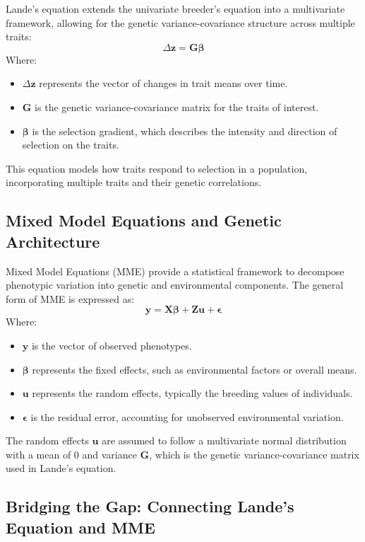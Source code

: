 \documentclass[12pt,a4paper]{article}
\begin{document}
Lande's equation extends the univariate breeder's equation into a multivariate framework, allowing for the genetic variance-covariance structure across multiple traits:
\[
\Delta \mathbf{z} = \mathbf{G} \boldsymbol{\beta}
\]
Where:
\begin{itemize}
    \item \( \Delta \mathbf{z} \) represents the vector of changes in trait means over time.
    \item \( \mathbf{G} \) is the genetic variance-covariance matrix for the traits of interest.
    \item \( \boldsymbol{\beta} \) is the selection gradient, which describes the intensity and direction of selection on the traits.
\end{itemize}
This equation models how traits respond to selection in a population, incorporating multiple traits and their genetic correlations.

\subsection{Mixed Model Equations and Genetic Architecture}

Mixed Model Equations (MME) provide a statistical framework to decompose phenotypic variation into genetic and environmental components. The general form of MME is expressed as:
\[
\mathbf{y} = \mathbf{X} \boldsymbol{\beta} + \mathbf{Z} \mathbf{u} + \boldsymbol{\epsilon}
\]
Where:
\begin{itemize}
    \item \( \mathbf{y} \) is the vector of observed phenotypes.
    \item \( \boldsymbol{\beta} \) represents the fixed effects, such as environmental factors or overall means.
    \item \( \mathbf{u} \) represents the random effects, typically the breeding values of individuals.
    \item \( \boldsymbol{\epsilon} \) is the residual error, accounting for unobserved environmental variation.
\end{itemize}
The random effects \( \mathbf{u} \) are assumed to follow a multivariate normal distribution with a mean of 0 and variance \( \mathbf{G} \), which is the genetic variance-covariance matrix used in Lande’s equation. 

\subsection{Bridging the Gap: Connecting Lande’s Equation and MME}
\end{document}
